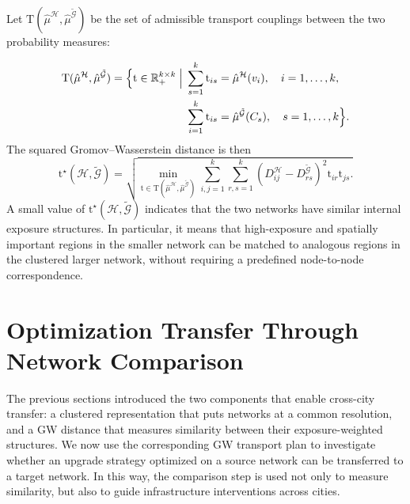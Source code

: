 \documentclass[lettersize,journal]{IEEEtran}
\begin{document}
Let $\mathrm{T}(\hat{\mu}^{\mathcal{H}},\hat{\mu}^{\tilde{\mathcal{G}}})$ be the set of admissible
transport couplings between the two probability measures:

\begin{equation}
\begin{aligned}
    \mathrm{T}(\hat{\mu}^{\mathcal{H}},\hat{\mu}^{\tilde{\mathcal{G}}})
    =
    \Bigl\{
    \mathrm{t}\in\mathbb{R}_{+}^{k\times k}
    \;\Big|\;&
    \sum_{s=1}^{k}\mathrm{t}_{is}
    =
    \hat{\mu}^{\mathcal{H}}(v_i),
    \quad i=1,\dots,k,\\
    &
    \sum_{i=1}^{k}\mathrm{t}_{is}
    =
    \hat{\mu}^{\tilde{\mathcal{G}}}(C_s),
    \quad s=1,\dots,k
    \Bigr\}.
\end{aligned}
\end{equation}
The squared Gromov--Wasserstein distance is then
\begin{equation}
\label{eq:gw_definition}
    \mathrm{t}^{\star}(\mathcal{H},\tilde{\mathcal{G}})
    = \sqrt{
    \min_{\mathrm{t}\in\mathrm{T}(\hat{\mu}^{\mathcal{H}},\hat{\mu}^{\tilde{\mathcal{G}}})}
    \sum_{i,j=1}^{k}
    \sum_{r,s=1}^{k}
    \left(
        D^{\mathcal{H}}_{ij}
        -
        D^{\tilde{\mathcal{G}}}_{rs}
    \right)^2
    \mathrm{t}_{ir}
    \mathrm{t}_{js}.}
\end{equation}
A small value of $\mathrm{t}^{\star}(\mathcal{H},\tilde{\mathcal{G}})$ indicates that the two
networks have similar internal exposure structures. In particular, it means that
high-exposure and spatially important regions in the smaller network can be
matched to analogous regions in the clustered larger network, without requiring
a predefined node-to-node correspondence.
\section{Optimization Transfer Through Network Comparison}
\label{sec:optimization_transfer}

The previous sections introduced the two components that enable cross-city
transfer: a clustered representation that puts networks at a common resolution,
and a GW distance that measures similarity between their exposure-weighted
structures. We now use the corresponding GW transport plan to investigate
whether an upgrade strategy optimized on a source network can be transferred to
a target network. In this way, the comparison step is used not only to measure
similarity, but also to guide infrastructure interventions across cities.
\end{document}
